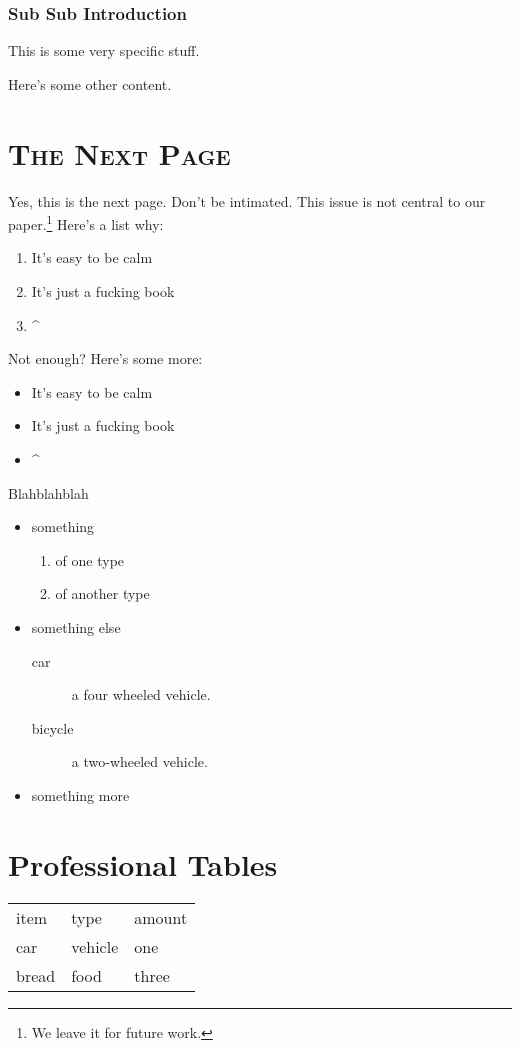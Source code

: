\documentclass{article}
\begin{document}
\subsubsection*{Sub Sub Introduction}
This is some very specific stuff.

Here's some other content.

\newpage

\section{\textsc{The Next Page}}
Yes, this is the next page. Don't be intimated. This issue is not central to our paper.\footnote{We leave it for future work.} Here's a list why:

\begin{enumerate}
\item It's easy to be calm
\item It's just a fucking book
\item \textasciicircum
\end{enumerate}

Not enough? Here's some more:

\begin{itemize}
\item It's easy to be calm
\item It's just a fucking book
\item \textasciicircum
\end{itemize}
Blahblahblah

\begin{itemize}
\item something
	\begin{enumerate}
	\item of one type
	\item of another type
	\end{enumerate}
\item something else
	\begin{description}
	\item[car] a four wheeled vehicle.
	\item[bicycle] a two-wheeled vehicle.
	\end{description}
\item something more
\end{itemize}

\newpage
\section{Professional Tables}
\begin{tabular}{lll}
item & type & amount\\
car & vehicle & one\\
bread & food & three
\end{tabular}
\end{document}
